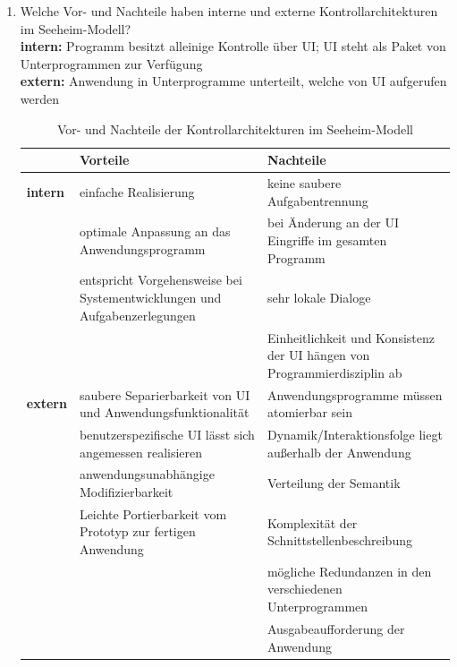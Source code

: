 \begin{enumerate}
	\item Welche Vor- und Nachteile haben interne und externe Kontrollarchitekturen
	im Seeheim-Modell?\\
	\textbf{intern:} Programm besitzt alleinige Kontrolle über UI; UI steht als Paket von Unterprogrammen zur Verfügung\\
	\textbf{extern:} Anwendung in Unterprogramme unterteilt, welche von UI aufgerufen werden\\
	\begin{table}[!h]
		\centering
		\begin{tabular}{|p{10em}|p{15em}|p{15em}|}
			\hline
			\hline
			& \textbf{Vorteile} & \textbf{Nachteile}\\
			\hline			
			\textbf{intern} & \tabitem einfache Realisierung & \tabitem keine saubere Aufgabentrennung\\
			&	\tabitem optimale Anpassung an das Anwendungsprogramm & \tabitem bei Änderung an der UI Eingriffe im gesamten Programm\\
			& \tabitem entspricht Vorgehensweise bei Systementwicklungen und Aufgabenzerlegungen & \tabitem sehr lokale Dialoge \\
			&& \tabitem Einheitlichkeit und Konsistenz der UI hängen von Programmierdisziplin ab \\
			\hline
			\hline
			\textbf{extern} &  \tabitem saubere Separierbarkeit von UI und Anwendungsfunktionalität & \tabitem Anwendungsprogramme müssen atomierbar sein\\
			& \tabitem benutzerspezifische UI lässt sich angemessen realisieren & \tabitem Dynamik/Interaktionsfolge liegt außerhalb der Anwendung\\
			& \tabitem anwendungsunabhängige Modifizierbarkeit & Verteilung der Semantik\\
			& \tabitem Leichte Portierbarkeit vom Prototyp zur fertigen Anwendung & \tabitem Komplexität der Schnittstellenbeschreibung\\
			&& \tabitem mögliche Redundanzen in den verschiedenen Unterprogrammen\\
			&& \tabitem Ausgabeaufforderung der Anwendung\\
			\hline
		\end{tabular}
		\caption{Vor- und Nachteile der Kontrollarchitekturen im Seeheim-Modell}
	\end{table}
	

\end{enumerate}
